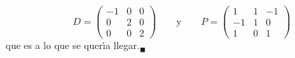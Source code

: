 \begin{solucion}
 \begin{equation*}
  D = 
  \begin{pmatrix}
   -1 & 0 & 0 \\
    0 & 2 & 0 \\
    0 & 0 & 2 
  \end{pmatrix}
  \qquad \text{y} \qquad 
  P = 
  \begin{pmatrix}
    1 & 1 & -1 \\
   -1 & 1 &  0 \\
    1 & 0 &  1
  \end{pmatrix}
 \end{equation*}
 que es a lo que se quer\'{\i}a llegar.${}_{\blacksquare}$
\end{solucion}

